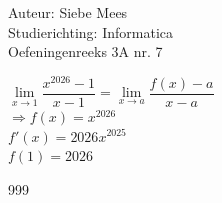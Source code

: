 \documentclass[a4paper]{article}
\begin{document}
  
\noindent \large Auteur: Siebe Mees \\
\noindent \large Studierichting: Informatica\\
\noindent \large Oefeningenreeks 3A nr. 7\\

\medskip

\normalsize

$ \lim\limits_{x \rightarrow 1}  \dfrac{x^{2026}-1}{x-1} = \lim\limits_{x \rightarrow a}  \dfrac{f(x)-a}{x-a} $\\

$ \Rightarrow f(x) = x^{2026} $ \\

$ f'(x) = 2026x^{2025} $ \\

$ f(1) = 2026 $\\ 


\begin{thebibliography}{999}
\end{thebibliography}
\end{document}

